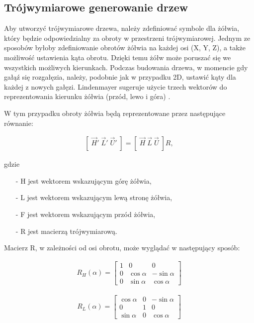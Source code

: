 \documentclass[a4paper,12pt,twoside]{book} %
\begin{document}
\subsection{Trójwymiarowe generowanie drzew}

Aby utworzyć trójwymiarowe drzewa, należy zdefiniować symbole dla żółwia, 
który będzie odpowiedzialny za obroty w przestrzeni trójwymiarowej. 
Jednym ze sposobów byłoby zdefiniowanie obrotów żółwia na każdej osi (X, Y, Z), 
a także możliwość ustawienia kąta obrotu. Dzięki temu żółw może poruszać się we 
wszystkich możliwych kierunkach. Podczas budowania drzewa, w momencie gdy gałąź 
się rozgałęzia, należy, podobnie jak w przypadku 2D, ustawić kąty dla każdej z 
nowych gałęzi. Lindenmayer sugeruje użycie trzech wektorów 
do reprezentowania kierunku żółwia (przód, lewo i góra) \cite{beautyofplants}.

W tym przypadku obroty żółwia będą reprezentowane przez 
następujące równanie:

\begin{gather}
	\left[ \; \overrightarrow{H}' \; \overrightarrow{L}' \; \overrightarrow{U}' \; \right] 
	= \left[ \; \overrightarrow{H} \; \overrightarrow{L} \;  \overrightarrow{U} \; \right] R,
\end{gather}

gdzie 
\begin{itemize}
	\item[-] H jest wektorem wskazującym górę żółwia, 
	\item[-] L jest wektorem wskazującym lewą stronę żółwia, 
	\item[-] F jest wektorem wskazującym przód żółwia,
	\item[-] R jest macierzą trójwymiarową.
\end{itemize}
 Macierz R, w zależności od osi obrotu, 
może wyglądać w następujący sposób:

\begin{gather}
	R_{H}(\alpha) =  
	\begin{bmatrix}
		1 & 0 & 0 \\
		0 & \cos{\alpha} & -\sin{\alpha}   \\
		0 & \sin{\alpha} & \cos{\alpha}  
	\end{bmatrix}
\end{gather}

\begin{gather}
	R_{L}(\alpha) =  
	\begin{bmatrix}
		\cos{\alpha} & 0 & -\sin{\alpha}   \\
		0 & 1 & 0 \\
		\sin{\alpha} & 0 &  \cos{\alpha}
	\end{bmatrix}
\end{gather}
\end{document}
